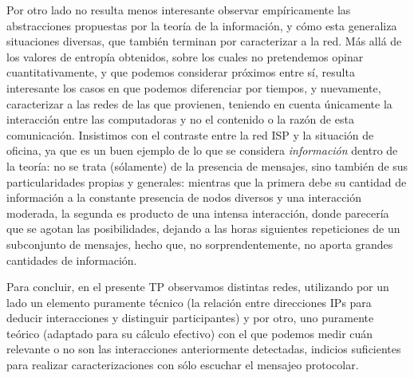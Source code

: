 Por otro lado no resulta menos interesante observar empíricamente las abstracciones propuestas por la teoría de la información, y cómo esta generaliza situaciones diversas, que también terminan por caracterizar a la red. Más allá de los valores de entropía obtenidos, sobre los cuales no pretendemos opinar cuantitativamente, y que podemos considerar próximos entre sí, resulta interesante los casos en que podemos diferenciar por tiempos, y nuevamente, caracterizar a las redes de las que provienen, teniendo en cuenta únicamente la interacción entre las computadoras y no el contenido o la razón de esta comunicación. Insistimos con el contraste entre la red ISP y la situación de oficina, ya que es un buen ejemplo de lo que se considera \emph{información} dentro de la teoría: no se trata (sólamente) de la presencia de mensajes, sino también de sus particularidades propias y generales: mientras que la primera debe su cantidad de información a la constante presencia de nodos diversos y una interacción moderada, la segunda es producto de una intensa interacción, donde parecería que se agotan las posibilidades, dejando a las horas siguientes repeticiones de un subconjunto de mensajes, hecho que, no sorprendentemente, no aporta grandes cantidades de información.

Para concluir, en el presente TP observamos distintas redes, utilizando por un lado un elemento puramente técnico (la relación entre direcciones IPs para deducir interacciones y distinguir participantes) y por otro, uno puramente teórico (adaptado para su cálculo efectivo) con el que podemos medir cuán relevante o no son las interacciones anteriormente detectadas, indicios suficientes para realizar caracterizaciones con sólo escuchar el mensajeo protocolar.
